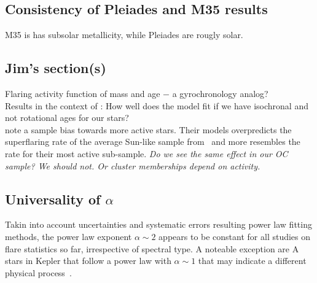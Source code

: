\documentclass{aa}
\begin{document}
\subsection{Consistency of Pleiades and M35 results}
M35 is has subsolar metallicity, while Pleiades are rougly solar.
\subsection{Jim's section(s)}
Flaring activity function of mass and age $-$ a gyrochronology analog?
\\
Results in the context of \citet{davenport_flaresevolve_2019}:
How well does the model fit if we have isochronal and not rotational ages for our stars?
\\
\citet{davenport_flaresevolve_2019} note a sample bias towards more active stars. Their models overpredicts the superflaring rate of the average Sun-like sample from~\citet{shibayama_2013} and more resembles the rate for their most active sub-sample. \textit{Do we see the same effect in our OC sample? We should not. Or cluster memberships depend on activity.}
\subsection{Universality of $\alpha$}
Takin into account uncertainties and systematic errors resulting power law fitting methods, the power law exponent $\alpha\sim 2$ appears to be constant for all studies on flare statistics so far, irrespective of spectral type. A noteable exception are A stars in Kepler that follow a power law with $\alpha\sim 1$ that may indicate a different physical process~\citep{yang_keplerflares_2019}.
\end{document}
